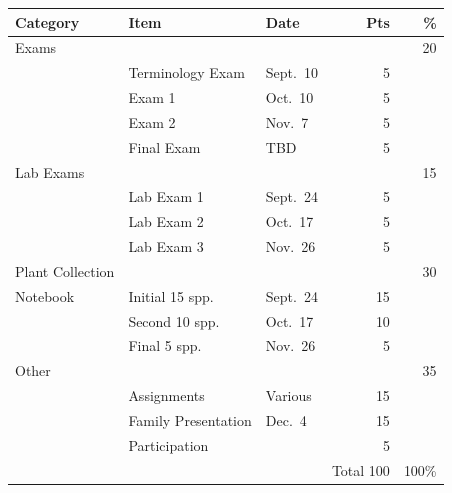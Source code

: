 \documentclass{tufte-handout}
\begin{document}
\begin{table}
\begin{tabular}{l l l r r}
Category & Item & Date &  Pts & \% \\
\hline
Exams & & & & 20 \\
& Terminology Exam & Sept.~10 & 5\\
& Exam 1 & Oct.~10  & 5 \\
& Exam 2 & Nov.~7  & 5 \\
& Final Exam & TBD & 5 \\ 
\hline
Lab Exams & & & & 15\\
& Lab Exam 1 & Sept.~24  & 5 \\
& Lab Exam 2 & Oct.~17 & 5 \\
& Lab Exam 3 & Nov.~26  & 5 \\ 	
\hline
Plant Collection & & & & 30 \\
Notebook & Initial 15 spp. & Sept.~24 & 15 \\
& Second 10 spp. & Oct.~17 & 10 \\
& Final 5 spp. & Nov.~26 & 5 \\
\hline 
Other & & & & 35 \\
& Assignments & Various & 15 \\
& Family Presentation & Dec.~4 & 15 \\
 & Participation &  & 5 \\
\hline
& & & Total 100 & 100\%
\end{tabular}
\end{table}
\end{document}

